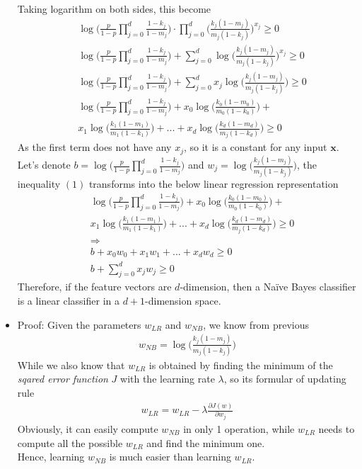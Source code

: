 \documentclass[a4paper]{scrartcl}
\begin{document}
\begin{itemize}
Taking logarithm on both sides, this become
\begin{align*}
  &\ \log{\Bigg(\frac{p}{1-p} {\displaystyle \prod_{j=0}^{d}} \frac{1-k_j}{1-m_j}\Bigg) \cdot {\displaystyle \prod_{j=0}^{d}} \Bigg(\frac{k_j(1-m_j)}{m_j(1-k_j)}\Bigg)^{x_j}} \geq 0\\
  &\ \log{\Bigg(\frac{p}{1-p} {\displaystyle \prod_{j=0}^{d}} \frac{1-k_j}{1-m_j}\Bigg)} + {\displaystyle \sum_{j=0}^{d}} \log{\Bigg(\frac{k_j(1-m_j)}{m_j(1-k_j)}\Bigg)^{x_j}} \geq 0\\
  &\ \log{\Bigg(\frac{p}{1-p} {\displaystyle \prod_{j=0}^{d}} \frac{1-k_j}{1-m_j}\Bigg)} + {\displaystyle \sum_{j=0}^{d}} x_j\log{\Bigg(\frac{k_j(1-m_j)}{m_j(1-k_j)}\Bigg)} \geq 0\\
  &\ \log{\Bigg(\frac{p}{1-p} {\displaystyle \prod_{j=0}^{d}} \frac{1-k_j}{1-m_j}\Bigg)} + x_0\log{\Bigg(\frac{k_0(1-m_0)}{m_0(1-k_0)}\Bigg)} + \\ &\ x_1\log{\Bigg(\frac{k_1(1-m_1)}{m_1(1-k_1)}\Bigg)}+...+ x_d\log{\Bigg(\frac{k_d(1-m_d)}{m_j(1-k_d)}\Bigg)}\geq 0
\end{align*}
As the first term does not have any $x_j$, so it is a constant for any input $\textbf{x}$.\\
Let's denote $b=\log{\Big(\frac{p}{1-p} {\displaystyle \prod_{j=0}^{d}} \frac{1-k_j}{1-m_j}\Big)}$ and $w_j=\log{\Big(\frac{k_j(1-m_j)}{m_j(1-k_j)}\Big)}$, the inequality $(1)$ transforms into the below linear regression representation\\
\begin{align*}
  &\ \log{\Bigg(\frac{p}{1-p} {\displaystyle \prod_{j=0}^{d}} \frac{1-k_j}{1-m_j}\Bigg)} + x_0\log{\Bigg(\frac{k_0(1-m_0)}{m_0(1-k_0)}\Bigg)} + \\ &\ x_1\log{\Bigg(\frac{k_1(1-m_1)}{m_1(1-k_1)}\Bigg)}+...+ x_d\log{\Bigg(\frac{k_d(1-m_d)}{m_j(1-k_d)}\Bigg)}\geq 0\\
  &\ \Rightarrow \\
  &\ b + x_0 w_0 + x_1 w_1 +...+ x_d w_d \geq 0\\
  &\ b + {\displaystyle \sum_{j=0}^{d}} x_j w_j \geq 0
\end{align*}
Therefore, if the feature vectors are $d$-dimension, then a Na\"ive Bayes classifier is
a linear classifier in a $d+1$-dimension space.
\item Proof: Given the parameters \textbf{$w_{LR}$} and \textbf{$w_{NB}$}, we know from previous
\begin{align*}
w_{NB}=\log{\Big(\frac{k_j(1-m_j)}{m_j(1-k_j)}\Big)}
\end{align*}
While we also know that \textbf{$w_{LR}$} is obtained by finding the minimum of the \textsl{sqared error function} $J$ with the learning rate $\lambda$, so its formular of updating rule
\begin{align*}
  w_{LR}= w_{LR} - \lambda \frac{\partial J(w) }{\partial w_j}
\end{align*}
Obviously, it can easily compute \textbf{$w_{NB}$} in only 1 operation, while \textbf{$w_{LR}$} needs to compute all the possible \textbf{$w_{LR}$} and find the minimum one.\\
Hence, learning \textbf{$w_{NB}$} is much easier than learning \textbf{$w_{LR}$}.
\end{itemize}
\end{document}
